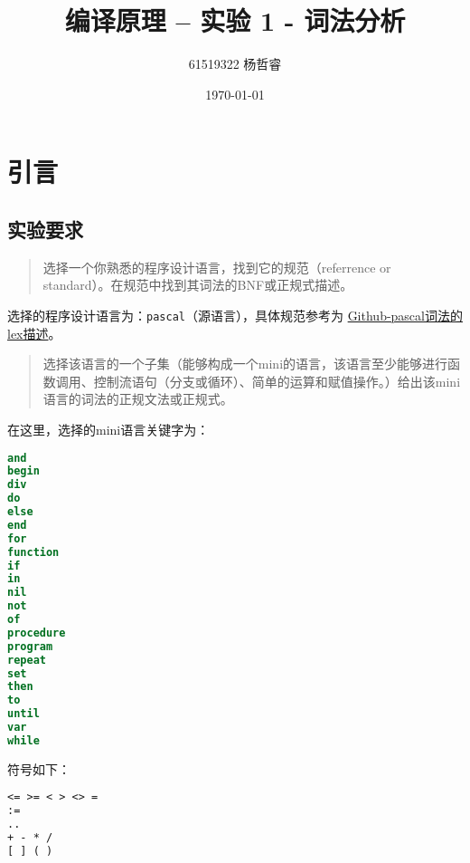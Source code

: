 \documentclass[lang=cn]{elegantpaper}
\title{编译原理 -- 实验 1 - 词法分析}
\author{61519322 杨哲睿}
\date{\today}
\begin{document}
\maketitle

\tableofcontents




\section{引言}

\subsection{实验要求}

\begin{quote}
    选择一个你熟悉的程序设计语言，找到它的规范（referrence or standard）。在规范中找到其词法的BNF或正规式描述。
\end{quote}

\begin{remark}
    选择的程序设计语言为：\lstinline|pascal|（源语言），具体规范参考为 \hyperref{https://github.com/bonzini/flex/blob/master/examples/manual/pascal.lex}{}{}{Github-pascal词法的lex描述}。
\end{remark}

\begin{quotation}
    选择该语言的一个子集（能够构成一个mini的语言，该语言至少能够进行函数调用、控制流语句（分支或循环）、简单的运算和赋值操作。）给出该mini语言的词法的正规文法或正规式。
    
\end{quotation}

在这里，选择的mini语言关键字为：

\begin{lstlisting}[language=pascal]
and
begin
div
do
else
end
for
function
if
in
nil
not
of
procedure
program
repeat
set
then
to
until
var
while
\end{lstlisting}

符号如下：

\begin{lstlisting}[language=pascal]
<= >= < > <> =
:=
..
+ - * /
[ ] ( )
\end{lstlisting}
\end{document}
